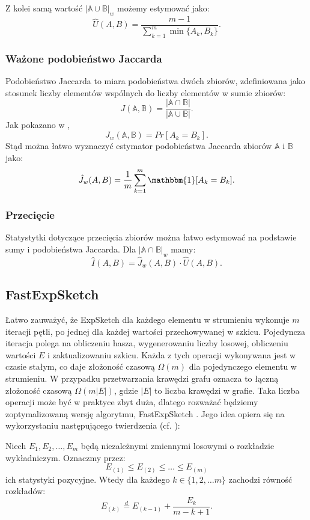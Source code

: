     Z kolei samą wartość $|\mathbb{A} \cup \mathbb{B}|_{w}$ możemy estymować jako:
    \[
        \hat{U}(A, B) = \frac{m - 1}{\sum\limits_{k = 1}^{m} \min{\{A_k, B_k\}}} .
    \]

    \subsubsection*{Ważone podobieństwo Jaccarda} 
    Podobieństwo Jaccarda to miara podobieństwa dwóch zbiorów, zdefiniowana jako stosunek liczby elementów wspólnych do liczby elementów w sumie zbiorów:
    \[
        J(\mathbb{A}, \mathbb{B}) = \frac{|\mathbb{A} \cap \mathbb{B}|}{|\mathbb{A} \cup \mathbb{B}|}.
    \]
    Jak pokazano w \cite{Lemiesz_2021}, 
    \[
        J_w(\mathbb{A}, \mathbb{B}) = Pr[A_k = B_k]. 
    \]
    Stąd można łatwo wyznaczyć estymator podobieństwa Jaccarda zbiorów $\mathbb{A}$ i $\mathbb{B}$ jako:
    \[
        \hat{J}_w(A, B) = \frac{1}{m} \sum\limits_{k = 1}^{m} \mathbbm{1}[A_k = B_k].  
    \]

    \subsubsection*{Przecięcie}
    Statystytki dotyczące przecięcia zbiorów można łatwo estymować na podstawie sumy i podobieństwa Jaccarda. Dla $|\mathbb{A} \cap \mathbb{B}|_{w}$ mamy:
    \[
        \hat{I}(A, B) = \hat{J}_w(A, B) \cdot \hat{U}(A, B).  
    \]


    
    
\subsection{FastExpSketch}
    Łatwo zauważyć, że ExpSketch dla każdego elementu w strumieniu wykonuje $m$ iteracji pętli, po jednej dla każdej wartości przechowywanej w szkicu. Pojedyncza iteracja polega na obliczeniu hasza, wygenerowaniu liczby losowej, obliczeniu wartości $E$ i zaktualizowaniu szkicu. Każda z tych operacji wykonywana jest w czasie stałym, co daje złożoność czasową $\Omega(m)$ dla pojedynczego elementu w strumieniu. W przypadku przetwarzania krawędzi grafu oznacza to łączną złożoność czasową $\Omega(m|E|)$, gdzie $|E|$ to liczba krawędzi w grafie. Taka liczba operacji może być w praktyce zbyt duża, dlatego rozważać będziemy zoptymalizowaną wersję algorytmu, FastExpSketch \cite{Lemiesz_2023}. Jego idea opiera się na wykorzystaniu następującego twierdzenia (cf. \cite{Devroye_1986a}):
    \begin{twierdzenie}
        \label{theo:orderStatsExp}        
        Niech $E_1, E_2, \dots, E_m$ będą niezależnymi zmiennymi losowymi o rozkładzie wykładniczym. Oznaczmy przez:
        \[
            E_{(1)} \leq E_{(2)} \leq \dots \leq E_{(m)}  
        \]
        ich statystyki pozycyjne. Wtedy dla każdego $k \in \{1,2, \dots m\}$ zachodzi równość rozkładów: 
        \[
            E_{(k)} \stackrel{d}{=} E_{(k - 1)} + \frac{E_k}{m - k + 1}.       
        \]
    \end{twierdzenie}

